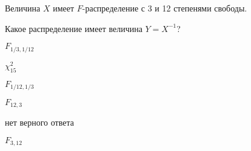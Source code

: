 
\begin{question}
Величина \(X\) имеет \(F\)-распределение с 3 и 12 степенями свободы.

Какое распределение имеет величина \(Y = X^{-1}\)?
\begin{answerlist}
  \item \(F_{1/3, 1/12}\)
  \item \(\chi^2_{15}\)
  \item \(F_{1/12, 1/3}\)
  \item \(F_{12, 3}\)
  \item нет верного ответа
  \item \(F_{3, 12}\)
\end{answerlist}
\end{question}


